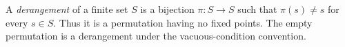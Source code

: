 
A \emph{derangement} of a finite set $S$ is a bijection $\pi:S\to S$ such that $\pi(s)\ne s$ for every $s\in S$. Thus it is a permutation having no fixed points. The empty permutation is a derangement under the vacuous-condition convention.
